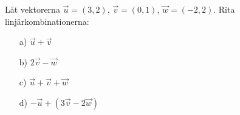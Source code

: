Låt vektorerna $\vec{u} = (3,2)$, $\vec{v} = (0,1)$, $\vec{w} = (-2,2)$.
Rita linjärkombinationerna:
\begin{itemize}
\item[a) ] $\vec{u} + \vec{v}$  
\item[b) ] $2\vec{v} - \vec{w}$
\item[c) ] $\vec{u} + \vec{v} + \vec{w}$
\item[d) ] $-\vec{u} + (3\vec{v} - 2\vec{w})$
\end{itemize}